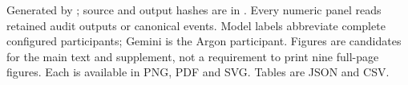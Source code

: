 Generated by ; source and output hashes are in . Every numeric panel reads retained audit outputs or canonical events. Model labels abbreviate complete configured participants; Gemini is the Argon participant. Figures are candidates for the main text and supplement, not a requirement to print nine full-page figures. Each is available in PNG, PDF and SVG. Tables are JSON and CSV.

